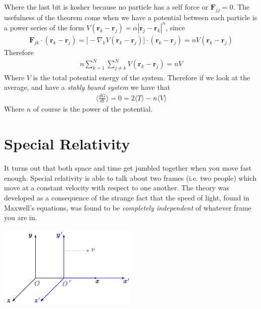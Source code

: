 Where the last bit is kosher because no particle has a self force or $\textbf{F}_{jj} = 0$. The usefulness of the theorem come when we have a potential between each particle is a power series of the form $V(\textbf{r}_k - \textbf{r}_j)  = \alpha |\textbf{r}_j-\textbf{r}_k|^n$, since
\begin{align}
\textbf{F}_{jk}\cdot(\textbf{r}_k - \textbf{r}_j) = \Big[-\nabla_k V(\textbf{r}_k - \textbf{r}_j) \Big]\cdot(\textbf{r}_k - \textbf{r}_j) = n V(\textbf{r}_k - \textbf{r}_j) 
\end{align}
Therefore
\begin{align}
n \sum_{k=1}^N \sum_{j\neq k}^N V(\textbf{r}_k - \textbf{r}_j) = nV
\end{align}
Where $V$ is the total potential energy of the system. Therefore if we look at the average, and have a \emph{stably bound system} we have that
\begin{align}
\Big\langle\frac{dG}{dt}\Big\rangle = 0 = 2\langle T \rangle - n\langle V \rangle 
\end{align}
Where $n$ of course is the power of the potential.



\section{Special Relativity}
It turns out that both space and time get jumbled together when you move fast enough. Special relativity is able to talk about two frames (i.e. two people) which move at a constant velocity with respect to one another. The theory was developed as a consequence of the strange fact that the speed of light, found in Maxwell's equations, was found to be \emph{completely independent} of whatever frame you are in. 

\centerline{\includegraphics[width=0.5\textwidth]{physics/images/relativity}}


